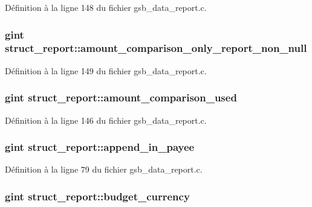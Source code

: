 Définition à la ligne 148 du fichier gsb\_\-data\_\-report.c.

\subsubsection[{amount\_\-comparison\_\-only\_\-report\_\-non\_\-null}]{\setlength{\rightskip}{0pt plus 5cm}gint {\bf struct\_\-report::amount\_\-comparison\_\-only\_\-report\_\-non\_\-null}}\label{structstruct__report_ae2f917737d7539826121715a3a35b82a}


Définition à la ligne 149 du fichier gsb\_\-data\_\-report.c.

\subsubsection[{amount\_\-comparison\_\-used}]{\setlength{\rightskip}{0pt plus 5cm}gint {\bf struct\_\-report::amount\_\-comparison\_\-used}}\label{structstruct__report_a41c2bf29d16291655e32fb4ef359be9a}


Définition à la ligne 146 du fichier gsb\_\-data\_\-report.c.

\subsubsection[{append\_\-in\_\-payee}]{\setlength{\rightskip}{0pt plus 5cm}gint {\bf struct\_\-report::append\_\-in\_\-payee}}\label{structstruct__report_a0d108870c82523c3bd947c2fbe8c76dd}


Définition à la ligne 79 du fichier gsb\_\-data\_\-report.c.

\subsubsection[{budget\_\-currency}]{\setlength{\rightskip}{0pt plus 5cm}gint {\bf struct\_\-report::budget\_\-currency}}\label{structstruct__report_a0bee54a9daf8041609a956b6ca7e2841}


